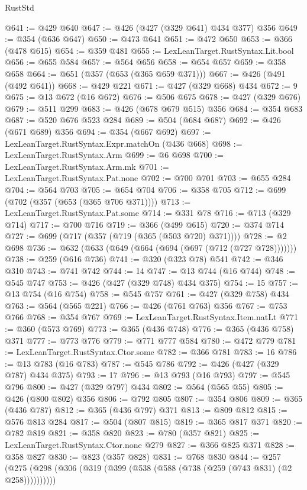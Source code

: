 \begin{lexlean}{RustStd}
\begin{coremodule}
{\begin{coremodule}
{{{{{{{{{@641 := @429 @640
@647 := @426 (@427 (@329 @641) @434 @377) @356
@649 := @354 (@636 @647)
@650 := @473 @641
@651 := @472 @650
@653 := @366 (@478 @615)
@654 := @359 @481
@655 := LexLeanTarget.RustSyntax.Lit.bool
@656 := @655 @584
@657 := @564 @656
@658 := @654 @657
@659 := @358 @658
@664 := @651 (@357 (@653 (@365 @659 @371)))
@667 := @426 (@491 (@492 @641))
@668 := @429 @221
@671 := @427 (@329 @668) @434
@672 := 9
@675 := @13 @672 (@16 @672)
@676 := @506 @675
@678 := @427 (@329 @676)
@679 := @511 @299
@683 := @426 (@678 @679 @515) @356
@684 := @354 @683
@687 := @520 @676 @523 @284
@689 := @504 (@684 @687)
@692 := @426 (@671 @689) @356
@694 := @354 (@667 @692)
@697 := LexLeanTarget.RustSyntax.Expr.matchOn (@436 @668)
@698 := LexLeanTarget.RustSyntax.Arm
@699 := @6 @698
@700 := LexLeanTarget.RustSyntax.Arm.mk
@701 := LexLeanTarget.RustSyntax.Pat.none
@702 := @700 @701
@703 := @655 @284
@704 := @564 @703
@705 := @654 @704
@706 := @358 @705
@712 := @699 (@702 (@357 (@653 (@365 @706 @371))))
@713 := LexLeanTarget.RustSyntax.Pat.some
@714 := @331 @78
@716 := @713 (@329 @714)
@717 := @700 @716
@719 := @366 (@499 @615)
@720 := @374 @714
@727 := @699 (@717 (@357 (@719 (@365 (@503 @720) @371))))
@728 := @2 @698
@736 := @632 (@633 (@649 (@664 (@694 (@697 (@712 (@727 @728)))))))
@738 := @259 (@616 @736)
@741 := @320 (@323 @78) @541
@742 := @346 @310
@743 := @741 @742
@744 := 14
@747 := @13 @744 (@16 @744)
@748 := @545 @747
@753 := @426 (@427 (@329 @748) @434 @375)
@754 := 15
@757 := @13 @754 (@16 @754)
@758 := @545 @757
@761 := @427 (@329 @758) @434
@763 := @564 (@565 @221)
@766 := @426 (@761 @763) @356
@767 := @753 @766
@768 := @354 @767
@769 := LexLeanTarget.RustSyntax.Item.natLt
@771 := @360 (@573 @769)
@773 := @365 (@436 @748)
@776 := @365 (@436 @758) @371
@777 := @773 @776
@779 := @771 @777 @584
@780 := @472 @779
@781 := LexLeanTarget.RustSyntax.Ctor.some
@782 := @366 @781
@783 := 16
@786 := @13 @783 (@16 @783)
@787 := @545 @786
@792 := @426 (@427 (@329 @787) @434 @375)
@793 := 17
@796 := @13 @793 (@16 @793)
@797 := @545 @796
@800 := @427 (@329 @797) @434
@802 := @564 (@565 @55)
@805 := @426 (@800 @802) @356
@806 := @792 @805
@807 := @354 @806
@809 := @365 (@436 @787)
@812 := @365 (@436 @797) @371
@813 := @809 @812
@815 := @576 @813 @284
@817 := @504 (@807 @815)
@819 := @365 @817 @371
@820 := @782 @819
@821 := @358 @820
@823 := @780 (@357 @821)
@825 := LexLeanTarget.RustSyntax.Ctor.none @279
@827 := @366 @825 @371
@828 := @358 @827
@830 := @823 (@357 @828)
@831 := @768 @830
@844 := @257 (@275 (@298 (@306 (@319 (@399 (@538 (@588 (@738 (@259 (@743 @831) (@2 @258))))))))))
}}}}}}}}}
\end{coremodule}}
\end{coremodule}
\end{lexlean}
